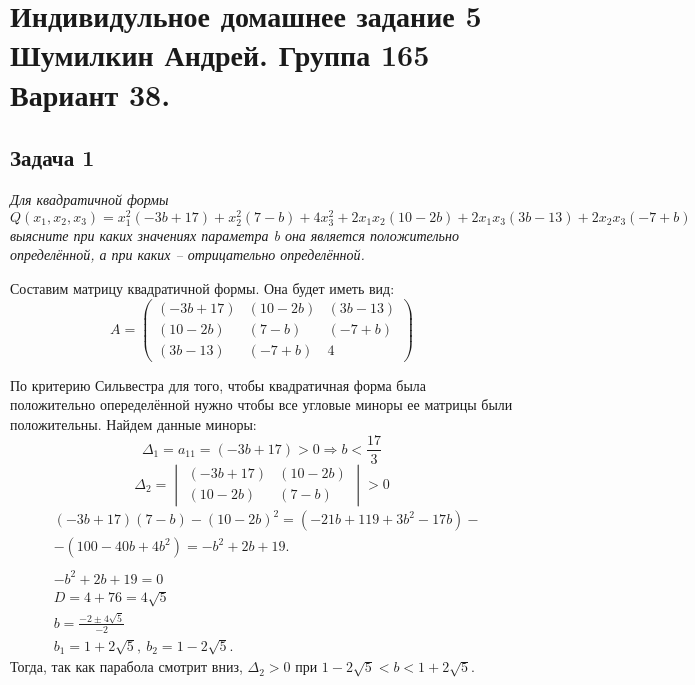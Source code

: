 

	\section{Индивидульное домашнее задание 5 \\ Шумилкин Андрей. Группа 165 \\ Вариант 38. } 
	\subsection{Задача 1} 
	\textit{Для квадратичной формы 
		\[
		Q(x_1, x_2, x_3) = x_1^2(-3b + 17) + x_2^2(7 - b) + 4x_3^2 + 2x_1x_2(10 - 2b) + 2x_1x_3(3b - 13) + 2x_2x_3(-7 + b)
		\]
	выясните при каких значениях параметра b она является положительно определённой, а при каких -- отрицательно определённой.}

	Составим матрицу квадратичной формы. Она будет иметь вид: 
	\[ A=
	\begin{pmatrix}
	(-3b + 17) & (10 - 2b) & (3b - 13) \\
	(10 - 2b) & (7 - b) & (-7 + b) \\
	(3b - 13) & (-7 + b) & 4
	\end{pmatrix}
	\]
	
	По критерию Сильвестра для того, чтобы квадратичная форма была положительно опеределённой нужно чтобы все угловые миноры ее матрицы были положительны. Найдем данные миноры:
	\[
		\Delta_1 = a_{11} = (-3b + 17) > 0 \Rightarrow b < \frac{17}{3}
	\]
	\[
		\Delta_2 = \begin{vmatrix}
		(-3b + 17) & (10 - 2b) \\
		(10 - 2b) & (7 - b)
		\end{vmatrix} > 0
	\]
	\begin{align*}
	&(-3b + 17)(7 - b) - (10 - 2b)^2 = (-21b + 119 + 3b^2 -17b) - \\ 
	& - (100 -40b + 4b^2) = -b^2 + 2b + 19. \\
	\\
	&-b^2 + 2b + 19 = 0 \\
	&D = 4 + 76 = 4\sqrt{5} \\
	&b = \frac{-2 \pm 4\sqrt{5}}{-2} \\
	&b_1 = 1 + 2\sqrt{5},\ b_2 = 1 - 2\sqrt{5}.
	\end{align*}
	Тогда, так как парабола смотрит вниз, $\Delta_2 > 0$ при $1 - 2\sqrt{5} < b < 1 + 2\sqrt{5}$.

